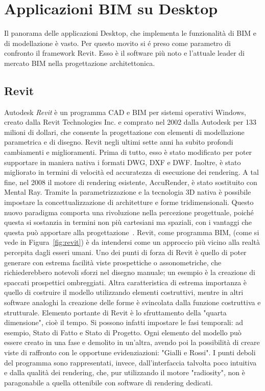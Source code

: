\section{Applicazioni BIM su Desktop}
\label{sec:chapter_1_section_2}
Il panorama delle applicazioni Desktop, che implementa le funzionalit\`a di BIM e di modellazione \`e vasto. Per questo movito si \'e
preso come parametro di confronto il framework Revit. Esso \`e il software più noto e l’attuale leader di mercato BIM nella
progettazione architettonica.

\subsection*{Revit}
\label{sec:chapter_1_section_2_sub_1}
Autodesk \emph{Revit} è un programma CAD e BIM per sistemi operativi Windows, creato dalla Revit Technologies Inc. e comprato
nel 2002 dalla Autodesk per 133 milioni di dollari, che consente la progettazione con elementi di modellazione parametrica
 e di disegno.
Revit negli ultimi sette anni ha subito profondi cambiamenti e miglioramenti. Prima di tutto, esso è stato modificato per poter
 supportare in maniera nativa i formati DWG, DXF e DWF. Inoltre, è stato migliorato in termini di velocità ed accuratezza di
  esecuzione dei rendering. A tal fine, nel 2008 il motore di rendering esistente, AccuRender, è stato sostituito con Mental Ray.
Tramite la parametrizzazione e la tecnologia 3D nativa è possibile impostare la concettualizzazione di architetture e forme
tridimensionali. Questo nuovo paradigma comporta una rivoluzione nella percezione progettuale, poiché questa si sostanzia in
 termini non più cartesiani ma spaziali, con i vantaggi che questa può apportare alla progettazione~\cite{BIMrevolution}.
Revit, come programma BIM,  (come si vede in Figura~\ref{fig:revit}) è da intendersi come un approccio più vicino alla realtà
 percepita dagli esseri umani.
Uno dei punti di forza di Revit è quello di poter generare con estrema facilità viste prospettiche o assonometriche, che
richiederebbero notevoli sforzi nel disegno manuale; un esempio è la creazione di spaccati prospettici ombreggiati.
Altra caratteristica di estrema importanza è quello di costruire il modello utilizzando elementi costruttivi, mentre
 in altri software analoghi la creazione delle forme è svincolata dalla funzione costruttiva e strutturale.
 Elemento portante di Revit è lo sfruttamento della "quarta dimensione", cioè il tempo. Si possono infatti impostare le fasi
  temporali: ad esempio, Stato di Fatto e Stato di Progetto. Ogni elemento del modello può essere creato in una fase e demolito
   in un'altra,
avendo poi la possibilità di creare viste di raffronto con le opportune evidenziazioni: "Gialli e Rossi". I punti deboli del
programma sono rappresentati, invece, dall'interfaccia talvolta poco intuitiva e dalla qualità dei rendering, che, pur
utilizzando il motore "radiosity", non è paragonabile a quella ottenibile con software di rendering dedicati.\\

